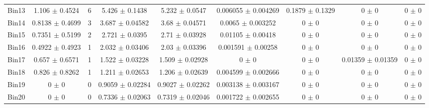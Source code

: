 \begin{tabular}{@{\extracolsep{4pt}}lcccccccc@{}}
     Bin13 & 1.106 $\pm$ 0.4524 & 6 & 5.426 $\pm$ 0.1438 & 5.232 $\pm$ 0.0547 & 0.006055 $\pm$ 0.004269 & 0.1879 $\pm$ 0.1329 & 0 $\pm$ 0 & 0 $\pm$ 0 \\ 
     Bin14 & 0.8138 $\pm$ 0.4699 & 3 & 3.687 $\pm$ 0.04582 & 3.68 $\pm$ 0.04571 & 0.0065 $\pm$ 0.003252 & 0 $\pm$ 0 & 0 $\pm$ 0 & 0 $\pm$ 0 \\ 
     Bin15 & 0.7351 $\pm$ 0.5199 & 2 & 2.721 $\pm$ 0.0395 & 2.71 $\pm$ 0.03928 & 0.01105 $\pm$ 0.00418 & 0 $\pm$ 0 & 0 $\pm$ 0 & 0 $\pm$ 0 \\ 
     Bin16 & 0.4922 $\pm$ 0.4923 & 1 & 2.032 $\pm$ 0.03406 & 2.03 $\pm$ 0.03396 & 0.001591 $\pm$ 0.00258 & 0 $\pm$ 0 & 0 $\pm$ 0 & 0 $\pm$ 0 \\ 
     Bin17 & 0.657 $\pm$ 0.6571 & 1 & 1.522 $\pm$ 0.03228 & 1.509 $\pm$ 0.02928 & 0 $\pm$ 0 & 0 $\pm$ 0 & 0.01359 $\pm$ 0.01359 & 0 $\pm$ 0 \\ 
     Bin18 & 0.826 $\pm$ 0.8262 & 1 & 1.211 $\pm$ 0.02653 & 1.206 $\pm$ 0.02639 & 0.004599 $\pm$ 0.002666 & 0 $\pm$ 0 & 0 $\pm$ 0 & 0 $\pm$ 0 \\ 
     Bin19 & 0 $\pm$ 0 & 0 & 0.9059 $\pm$ 0.02284 & 0.9027 $\pm$ 0.02262 & 0.003138 $\pm$ 0.003167 & 0 $\pm$ 0 & 0 $\pm$ 0 & 0 $\pm$ 0 \\ 
     Bin20 & 0 $\pm$ 0 & 0 & 0.7336 $\pm$ 0.02063 & 0.7319 $\pm$ 0.02046 & 0.001722 $\pm$ 0.002655 & 0 $\pm$ 0 & 0 $\pm$ 0 & 0 $\pm$ 0 \\ 
\hline\hline
  \end{tabular}
